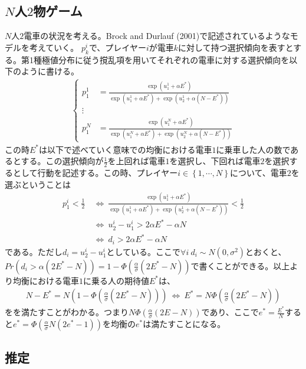 \documentclass{jsarticle}
\begin{document}
\subsection{$N$人$2$物ゲーム}
$N$人$2$電車の状況を考える。Brock and Durlauf (2001)で記述されているようなモデルを考えていく。
$p_k^i$で、プレイヤー$i$が電車$k$に対して持つ選択傾向を表すとする。第1種極値分布に従う撹乱項を用いてそれぞれの電車に対する選択傾向を以下のように書ける。
\begin{align*}
	\begin{cases}
	p_1^1 &= \frac{\exp(u_1^1 + \alpha E^*)}{\exp(u_1^1 + \alpha E^*) + \exp(u_2^1 + \alpha(N - E^*))}\\[8pt]
	\vdots\\[8pt]
	p_1^N &= \frac{\exp(u_1^N + \alpha E^*)}{\exp(u_1^N + \alpha E^*) + \exp(u_2^N + \alpha(N - E^*))}
	\end{cases}
\end{align*}
この時$E^*$は以下で述べていく意味での均衡における電車$1$に乗車した人の数であるとする。この選択傾向が$\frac{1}{2}$を上回れば電車$1$を選択し、下回れば電車$2$を選択するとして行動を記述する。この時、プレイヤー$i \in \left\{ 1, \cdots, N\right\}$について、電車$2$を選ぶということは
\begin{align*}
	p_1^i < \frac{1}{2}\ &\Leftrightarrow\ \frac{\exp(u_1^1 + \alpha E^*)}{\exp(u_1^1 + \alpha E^*) + \exp(u_2^1 + \alpha(N - E^*))} < \frac{1}{2}\\[8pt]
	&\Leftrightarrow\ u_2^i - u_1^i > 2\alpha E^* - \alpha N\\[8pt]
	&\Leftrightarrow\ d_i > 2\alpha E^* - \alpha N
\end{align*}
である。ただし$d_i = u_2^i - u_1^i$としている。ここで$\forall i\ d_i \sim N(0,\sigma^2)$とおくと、$Pr(d_i > \alpha(2E^* - N)) = 1 - \Phi \left(\frac{\alpha}{\sigma}(2 E^* - N)\right)$で書くことができる。以上より均衡における電車$1$に乗る人の期待値$ E^*$は、
\begin{align*}
	N - E^* =  N(1 - \Phi \left(\frac{\alpha}{\sigma}(2 E^* - N)\right))\ \Leftrightarrow\  E^* = N\Phi \left(\frac{\alpha}{\sigma}(2 E^* - N)\right)
\end{align*}
をを満たすことがわかる。つまり$N \Phi \left(\frac{\alpha}{\sigma}(2 E - N)\right)$であり、ここで$e^* = \frac{E^*}{N}$すると$e^* = \Phi \left(\frac{\alpha}{\sigma}N(2e^* - 1) \right)$を均衡の$e^*$は満たすことになる。

\subsection{推定}
\end{document}
